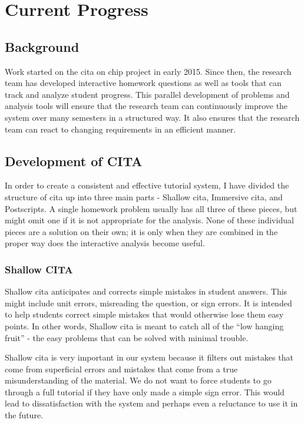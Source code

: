 \chapter[Current Progress]{Current Progress}

\section{Background}

Work started on the \gls{cita} on \gls{chip} project in early 2015. Since then, the research team has developed interactive homework questions as well as tools that can track and analyze student progress. This parallel development of problems and analysis tools will ensure that the research team can continuously improve the system over many semesters in a structured way. It also ensures that the research team can react to changing requirements in an efficient manner.

\section{Development of CITA}

In order to create a consistent and effective tutorial system, I have divided the structure of \gls{cita} up into three main parts - Shallow \gls{cita}, Immersive \gls{cita}, and Postscripts. A single homework problem usually has all three of these pieces, but might omit one if it is not appropriate for the analysis. None of these individual pieces are a solution on their own; it is only when they are combined in the proper way does the interactive analysis become useful.

\subsection{Shallow CITA}

Shallow \gls{cita} anticipates and corrects simple mistakes in student answers. This might include unit errors, misreading the question, or sign errors. It is intended to help students correct simple mistakes that would otherwise lose them easy points. In other words, Shallow \gls{cita} is meant to catch all of the ``low hanging fruit'' - the easy problems that can be solved with minimal trouble.

Shallow \gls{cita} is very important in our system because it filters out mistakes that come from superficial errors and mistakes that come from a true misunderstanding of the material. We do not want to force students to go through a full tutorial if they have only made a simple sign error. This would lead to dissatisfaction with the system and perhaps even a reluctance to use it in the future.


